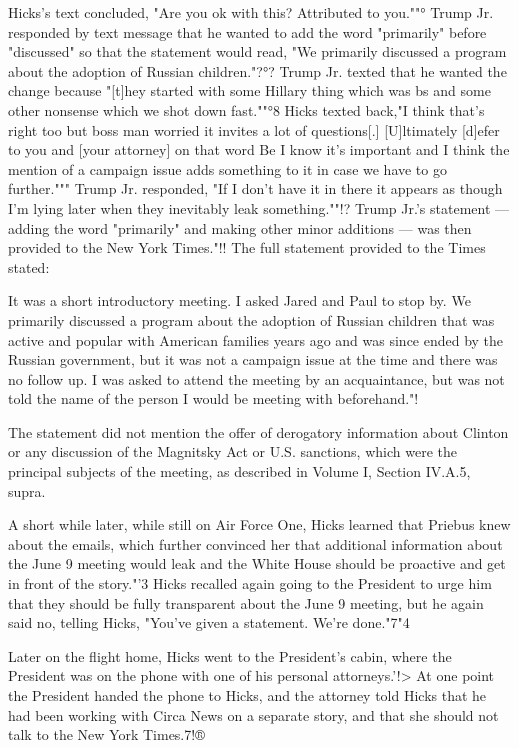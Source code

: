 Hicks's text concluded, "Are you ok with this? Attributed to you.""°
Trump Jr. responded by text message that he wanted to add the word "primarily" before "discussed" so that the statement would read, "We primarily discussed a program about the adoption of Russian children."?°?
Trump Jr. texted that he wanted the change because "[t]hey started with some Hillary thing which was bs and some other nonsense which we shot down fast.""°8
Hicks texted back,"I think that's right too but boss man worried it invites a lot of questions[.]
[U]ltimately [d]efer to you and [your attorney] on that word Be I know it's important and I think the mention of a campaign issue adds something to it in case we have to go further."""
Trump Jr. responded, "If I don't have it in there it appears as though I'm lying later when they inevitably leak something.""!?
Trump Jr.'s statement — adding the word "primarily" and making other minor additions — was then provided to the New York Times."!!
The full statement provided to the Times stated:

It was a short introductory meeting.
I asked Jared and Paul to stop by.
We primarily discussed a program about the adoption of Russian children that was active and popular with American families years ago and was since ended by the Russian government, but it was not a campaign issue at the time and there was no follow up.
I was asked to attend the meeting by an acquaintance, but was not told the name of the person I would be meeting with beforehand."!

The statement did not mention the offer of derogatory information about Clinton or any discussion of the Magnitsky Act or U.S. sanctions, which were the principal subjects of the meeting, as described in Volume I, Section IV.A.5, supra.

A short while later, while still on Air Force One, Hicks learned that Priebus knew about the emails, which further convinced her that additional information about the June 9 meeting would leak and the White House should be proactive and get in front of the story."'3
Hicks recalled again going to the President to urge him that they should be fully transparent about the June 9 meeting, but he again said no, telling Hicks, "You've given a statement.
We're done."7"4

Later on the flight home, Hicks went to the President's cabin, where the President was on the phone with one of his personal attorneys.'!>
At one point the President handed the phone to Hicks, and the attorney told Hicks that he had been working with Circa News on a separate story, and that she should not talk to the New York Times.7!®

